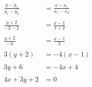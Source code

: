 \documentclass{article}
\begin{document}
\\
\begin{align*}
	\frac{y-y_1}{y_1-y_2}&=\frac{x-x_1}{x_1-x_2}\\
	\\
	\frac{y+2}{-2-2}&=\frac{x-1}{1+2}\\
	\\
	\frac{y+2}{-4}&=\frac{x-1}{3}\\
	\\
	3(y+2)&=-4(x-1)\\
	\\
	3y+6&=-4x+4\\
	\\
	4x+3y+2&=0\\
\end{align*}
\end{document}
